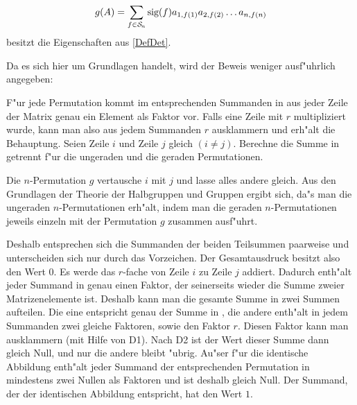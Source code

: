 \begin{satz}
\label{SatzDetPermut}
    \begin{equation}
    \label{EquDet}
       g(A) =
       \sum_{f \in \cal S \mit \!_n} 
           \mbox{\rm sig}(f) a_{1,f(1)} a_{2,f(2)} \ldots a_{n,f(n)}
    \end{equation}
    besitzt die Eigenschaften aus \ref{DefDet}.
\end{satz}
\begin{beweis}
    Da es sich hier um Grundlagen handelt, wird der Beweis weniger
    ausf"uhrlich angegeben:
    \begin{MyDescription}
         F"ur jede Permutation kommt im entsprechenden Summanden in
          aus jeder Zeile der Matrix genau ein Element als
         Faktor vor. Falls eine Zeile mit $r$ multipliziert wurde, kann
         man also aus jedem Summanden $r$ ausklammern und erh"alt die
         Behauptung.
         Seien Zeile $i$ und Zeile $j$ gleich $(i \neq j)$.
         Berechne die
         Summe in  getrennt f"ur die ungeraden und die
         geraden Permutationen.

         Die
         $n$-Permutation $g$ vertausche $i$ mit $j$ und lasse alles andere
         gleich. Aus den Grundlagen der Theorie der
         Halbgruppen und Gruppen ergibt sich, da"s man die ungeraden
         $n$-Permutationen erh"alt, indem man die geraden
         $n$-Permutationen jeweils einzeln mit der Permutation $g$
         zusammen ausf"uhrt.

         Deshalb entsprechen sich die Summanden der beiden Teilsummen
         paarweise und unterscheiden sich nur durch das Vorzeichen. Der
         Gesamtausdruck besitzt also den Wert $0$.
         Es werde das $r$-fache von Zeile $i$ zu Zeile $j$ addiert. Dadurch
         enth"alt jeder Summand in  genau einen Faktor,
         der seinerseits wieder die Summe zweier Matrizenelemente ist.
         Deshalb kann man die gesamte Summe in zwei Summen aufteilen.
         Die eine entspricht genau der Summe in , die andere
         enth"alt in jedem Summanden zwei gleiche
         Faktoren, sowie den Faktor $r$. 
         Diesen Faktor kann man ausklammern (mit Hilfe
         von \mbox{D1}). Nach \mbox{D2} ist der Wert dieser Summe dann
         gleich Null, und nur die andere bleibt "ubrig.
         Au"ser f"ur die identische Abbildung enth"alt jeder Summand
         der entsprechenden Permutation in  mindestens zwei
         Nullen als Faktoren und ist deshalb gleich Null. Der Summand, der
         der identischen Abbildung entspricht, hat den Wert $1$.
    \end{MyDescription}
    \nopagebreak
\end{beweis}

